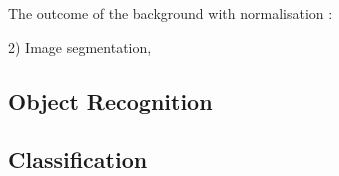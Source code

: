\documentclass[main.tex]{subfiles}
\begin{document}
The outcome of the background with normalisation :


%
%


2) Image segmentation,


\subsection{Object Recognition}


\subsection{Classification}
\end{document}
